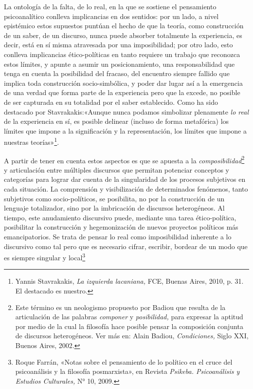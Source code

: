 La ontología de la falta, de lo real, en la que se sostiene el pensamiento psicoanalítico conlleva implicancias en dos sentidos: por un lado, a nivel epistémico estos supuestos puntúan el hecho de que la teoría, como construcción de un saber, de un discurso, nunca puede absorber totalmente la experiencia, es decir, está en sí misma atravesada por una imposibilidad; por otro lado, esto conlleva implicancias ético-políticas en tanto requiere un trabajo que reconozca estos límites, y apunte a asumir un posicionamiento, una responsabilidad que tenga en cuenta la posibilidad del fracaso, del encuentro siempre fallido que implica toda construcción socio-simbólica, y poder dar lugar así a la emergencia de una verdad que forma parte de la experiencia pero que la excede, no posible de ser capturada en su totalidad por el saber establecido. Como ha sido destacado por Stavrakakis:«Aunque nunca podamos simbolizar plenamente \emph{lo real} de la experiencia en sí, es posible delinear (incluso de forma metafórica) los límites que impone a la significación y la representación, los límites que impone a nuestras teorías»\footnote{Yannis Stavrakakis, \emph{La izquierda lacaniana,} FCE, Buenas Aires, 2010, p. 31. El destacado es nuestro.}.

A partir de tener en cuenta estos aspectos es que se apuesta a la \emph{composibilidad}\footnote{Este término es un neologismo propuesto por Badiou que resulta de la articulación de las palabras \emph{componer} y \emph{posibilidad,} para expresar la aptitud por medio de la cual la filosofía hace posible pensar la composición conjunta de discursos heterogéneos. Ver más en: Alain Badiou, \emph{Condiciones,} Siglo XXI, Buenos Aires, 2002.} y articulación entre múltiples discursos que permitan potenciar conceptos y categorías para lograr dar cuenta de la singularidad de los procesos subjetivos en cada situación. La comprensión y visibilización de determinados fenómenos, tanto subjetivos como socio-políticos, se posibilita, no por la construcción de un lenguaje totalizador, sino por la imbricación de discursos heterogéneos. Al tiempo, este anudamiento discursivo puede, mediante una tarea ético-política, posibilitar la construcción y hegemonización de nuevos proyectos políticos más emancipatorios. Se trata de pensar lo real como imposibilidad inherente a lo discursivo como tal pero que es necesario cifrar, escribir, bordear de un modo que es siempre singular y local\footnote{Roque Farrán, «Notas sobre el pensamiento de lo político en el cruce del psicoanálisis y la filosofía posmarxista», en Revista \emph{Psikeba. Psicoanálisis y Estudios Culturales,} N° 10, 2009.}

